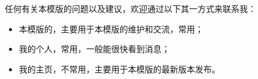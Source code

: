 \begin{conclusion}
    任何有关本模版的问题以及建议，欢迎通过以下其一方式来联系我：
    \begin{itemize}
        \item 本模版的\href{https://jq.qq.com/?_wv=1027&k=eA9mGWmS}{}，主要用于本模版的维护和交流，常用；
        \item 我的个人\href{https://space.bilibili.com/326100515}{}，常用，一般能很快看到消息；
        \item 我的\href{https://space.bilibili.com/326100515}{}主页，不常用，主要用于本模版的最新版本发布。
    \end{itemize}
\end{conclusion}